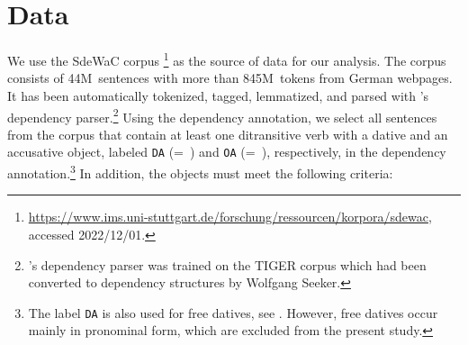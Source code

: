 \documentclass[output=paper,colorlinks,citecolor=brown]{langscibook}
\begin{document}
\section{Data}\label{sec:data}
We use the SdeWaC corpus \citep{sdewac}\footnote{%
\url{https://www.ims.uni-stuttgart.de/forschung/ressourcen/korpora/sdewac},\\accessed 2022/12/01.} %
as the source of data for our analysis. The corpus consists of 44M~sentences with more than 845M~tokens from German webpages. It has been automatically tokenized, tagged, lemmatized, and parsed with \citet{bohnet2010}'s dependency parser.\footnote{\citet{bohnet2010}'s dependency parser was trained on the TIGER corpus \citep[][release August 2007]{brants-et-al04} which had been converted to dependency structures by Wolfgang Seeker.} %
Using the dependency annotation, we select all sentences from the corpus that contain at least one ditransitive 
verb with a dative and an accusative object, labeled \texttt{DA} (=~\ReichDat{}) and \texttt{OA} (=~\ReichAcc{}), respectively, in the dependency annotation.\footnote{The label \texttt{DA} is also used for free datives, see \citet{brants-et-al04}. However, free datives occur mainly in pronominal form, which are excluded from the present study.} In addition, the objects must meet the following criteria:
\end{document}
